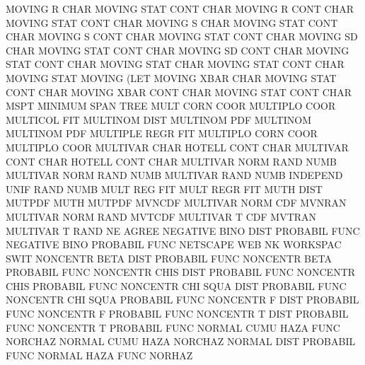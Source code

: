MOVING   R    CHAR                      MOVING   STAT CONT CHAR
MOVING   R    CONT CHAR                 MOVING   STAT CONT CHAR
MOVING   S    CHAR                      MOVING   STAT CONT CHAR
MOVING   S    CONT CHAR                 MOVING   STAT CONT CHAR
MOVING   SD   CHAR                      MOVING   STAT CONT CHAR
MOVING   SD   CONT CHAR                 MOVING   STAT CONT CHAR
MOVING   STAT CHAR                      MOVING   STAT CONT CHAR
MOVING   STAT                           MOVING   (LET
MOVING   XBAR CHAR                      MOVING   STAT CONT CHAR
MOVING   XBAR CONT CHAR                 MOVING   STAT CONT CHAR
MSPT                                    MINIMUM  SPAN TREE
MULT     CORN COOR                      MULTIPLO COOR
MULTICOL                                FIT
MULTINOM DIST                           MULTINOM PDF
MULTINOM                                MULTINOM PDF
MULTIPLE REGR                           FIT
MULTIPLO CORN COOR                      MULTIPLO COOR
MULTIVAR CHAR                           HOTELL   CONT CHAR
MULTIVAR CONT CHAR                      HOTELL   CONT CHAR
MULTIVAR NORM RAND NUMB                 MULTIVAR NORM RAND NUMB
MULTIVAR RAND NUMB                      INDEPEND UNIF RAND NUMB
MULT     REG                            FIT
MULT     REGR                           FIT
MUTH     DIST                           MUTPDF
MUTH                                    MUTPDF
MVNCDF                                  MULTIVAR NORM CDF
MVNRAN                                  MULTIVAR NORM RAND
MVTCDF                                  MULTIVAR T    CDF
MVTRAN                                  MULTIVAR T    RAND
NE                                      AGREE
NEGATIVE BINO DIST                      PROBABIL FUNC
NEGATIVE BINO                           PROBABIL FUNC
NETSCAPE                                WEB
NK                                      WORKSPAC SWIT
NONCENTR BETA DIST                      PROBABIL FUNC
NONCENTR BETA                           PROBABIL FUNC
NONCENTR CHIS DIST                      PROBABIL FUNC
NONCENTR CHIS                           PROBABIL FUNC
NONCENTR CHI  SQUA DIST                 PROBABIL FUNC
NONCENTR CHI  SQUA                      PROBABIL FUNC
NONCENTR F    DIST                      PROBABIL FUNC
NONCENTR F                              PROBABIL FUNC
NONCENTR T    DIST                      PROBABIL FUNC
NONCENTR T                              PROBABIL FUNC
NORMAL   CUMU HAZA FUNC                 NORCHAZ
NORMAL   CUMU HAZA                      NORCHAZ
NORMAL   DIST                           PROBABIL FUNC
NORMAL   HAZA FUNC                      NORHAZ
